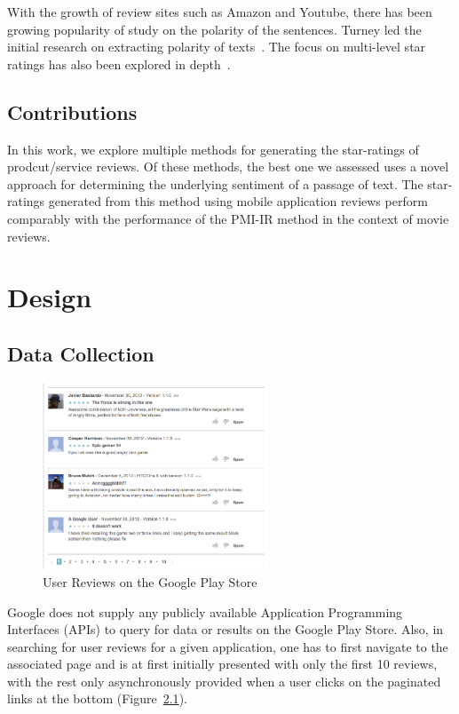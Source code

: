 \documentclass[11pt]{report} %
\begin{document}
With the growth of review sites such as Amazon and Youtube, there has been
growing popularity of study on the polarity of the sentences. Turney led the
initial research on extracting polarity of texts~\cite{Turney2001,
Pang:2002:TUS:1118693.1118704}. The focus on multi-level star ratings has also
been explored in depth~\cite{Pang+Lee:05a}.


\section{Contributions}

In this work, we explore multiple methods for generating the star-ratings of prodcut/service reviews. Of these methods, the best one we assessed uses a novel approach for determining the underlying sentiment of a passage of text. The star-ratings generated from this method using mobile application reviews perform comparably with the performance of the PMI-IR method in the context of movie reviews.

\chapter{Design}
\section{Data Collection}

\begin{figure}[h!]
  \centering
    \includegraphics[width=0.6\textwidth]{figures/playstore.png}
 \caption{User Reviews on the Google Play Store}
\label{fig:playstore}
\end{figure}

Google does not supply any publicly available Application Programming Interfaces (APIs) to query for data or results on the Google Play Store. Also, in searching for user reviews for a given application, one has to first navigate to the associated page and is at first initially presented with only the first 10 reviews, with the rest only asynchronously provided when a user clicks on the paginated links at the bottom (Figure~\ref{fig:playstore}). 
\end{document}
